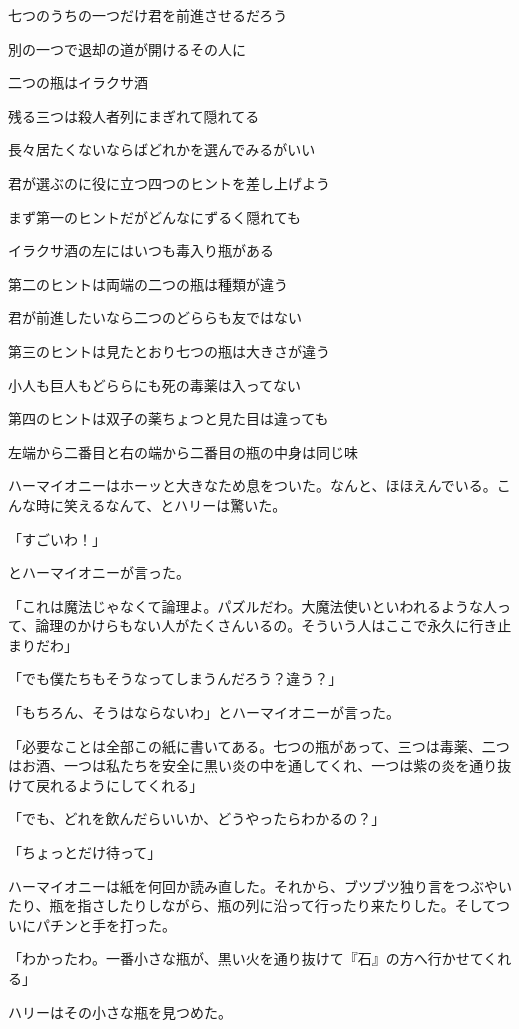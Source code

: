 \documentclass[10pt,a4paper]{article}
\begin{document}
\begin{CJK}{UTF8}{min}
七つのうちの一つだけ君を前進させるだろう

別の一つで退却の道が開けるその人に

二つの瓶はイラクサ酒

残る三つは殺人者列にまぎれて隠れてる

長々居たくないならばどれかを選んでみるがいい

君が選ぶのに役に立つ四つのヒントを差し上げよう

まず第一のヒントだがどんなにずるく隠れても

イラクサ酒の左にはいつも毒入り瓶がある

第二のヒントは両端の二つの瓶は種類が違う

君が前進したいなら二つのどららも友ではない

第三のヒントは見たとおり七つの瓶は大きさが違う

小人も巨人もどららにも死の毒薬は入ってない

第四のヒントは双子の薬ちょつと見た目は違っても

左端から二番目と右の端から二番目の瓶の中身は同じ味



ハーマイオニーはホーッと大きなため息をついた。なんと、ほほえんでいる。こんな時に笑えるなんて、とハリーは驚いた。

「すごいわ！」

とハーマイオニーが言った。

「これは魔法じゃなくて論理よ。パズルだわ。大魔法使いといわれるような人って、論理のかけらもない人がたくさんいるの。そういう人はここで永久に行き止まりだわ」

「でも僕たちもそうなってしまうんだろう？違う？」

「もちろん、そうはならないわ」とハーマイオニーが言った。

「必要なことは全部この紙に書いてある。七つの瓶があって、三つは毒薬、二つはお酒、一つは私たちを安全に黒い炎の中を通してくれ、一つは紫の炎を通り抜けて戻れるようにしてくれる」

「でも、どれを飲んだらいいか、どうやったらわかるの？」

「ちょっとだけ待って」

ハーマイオニーは紙を何回か読み直した。それから、ブツブツ独り言をつぶやいたり、瓶を指さしたりしながら、瓶の列に沿って行ったり来たりした。そしてついにパチンと手を打った。

「わかったわ。一番小さな瓶が、黒い火を通り抜けて『石』の方へ行かせてくれる」

ハリーはその小さな瓶を見つめた。


\end{CJK}
\end{document}
